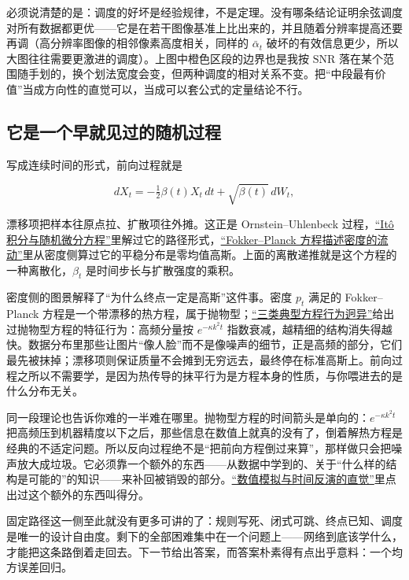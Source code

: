 必须说清楚的是：调度的好坏是经验规律，不是定理。没有哪条结论证明余弦调度对所有数据都更优——它是在若干图像基准上比出来的，并且随着分辨率提高还要再调（高分辨率图像的相邻像素高度相关，同样的 \(\bar\alpha_t\) 破坏的有效信息更少，所以大图往往需要更激进的调度）。上图中橙色区段的边界也是我按 \(\mathrm{SNR}\) 落在某个范围随手划的，换个划法宽度会变，但两种调度的相对关系不变。把``中段最有价值''当成方向性的直觉可以，当成可以套公式的定量结论不行。

\subsection{它是一个早就见过的随机过程}

写成连续时间的形式，前向过程就是

\[
dX_t = -\tfrac12\beta(t)X_t\,dt + \sqrt{\beta(t)}\,dW_t,
\]

漂移项把样本往原点拉、扩散项往外摊。这正是 Ornstein--Uhlenbeck 过程，\hyperref[sec:06-Random-Processes/06-Diffusion-and-SDE/03]{``Itô 积分与随机微分方程''}里解过它的路径形式，\hyperref[sec:06-Random-Processes/06-Diffusion-and-SDE/02]{``Fokker--Planck 方程描述密度的流动''}里从密度侧算过它的平稳分布是零均值高斯。上面的离散递推就是这个方程的一种离散化，\(\beta_t\) 是时间步长与扩散强度的乘积。

密度侧的图景解释了``为什么终点一定是高斯''这件事。密度 \(p_t\) 满足的 Fokker--Planck 方程是一个带漂移的热方程，属于抛物型；\hyperref[sec:15-Differential-Equations-and-Dynamical-Systems/03-PDE-Introduction/02]{``三类典型方程行为迥异''}给出过抛物型方程的特征行为：高频分量按 \(e^{-\kappa k^2 t}\) 指数衰减，越精细的结构消失得越快。数据分布里那些让图片``像人脸''而不是像噪声的细节，正是高频的部分，它们最先被抹掉；漂移项则保证质量不会摊到无穷远去，最终停在标准高斯上。前向过程之所以不需要学，是因为热传导的抹平行为是方程本身的性质，与你喂进去的是什么分布无关。

同一段理论也告诉你难的一半难在哪里。抛物型方程的时间箭头是单向的：\(e^{-\kappa k^2t}\) 把高频压到机器精度以下之后，那些信息在数值上就真的没有了，倒着解热方程是经典的不适定问题。所以反向过程绝不是``把前向方程倒过来算''，那样做只会把噪声放大成垃圾。它必须靠一个额外的东西——从数据中学到的、关于``什么样的结构是可能的''的知识——来补回被销毁的部分。\hyperref[sec:06-Random-Processes/06-Diffusion-and-SDE/04]{``数值模拟与时间反演的直觉''}里点出过这个额外的东西叫得分。

固定路径这一侧至此就没有更多可讲的了：规则写死、闭式可跳、终点已知、调度是唯一的设计自由度。剩下的全部困难集中在一个问题上——网络到底该学什么，才能把这条路倒着走回去。下一节给出答案，而答案朴素得有点出乎意料：一个均方误差回归。
